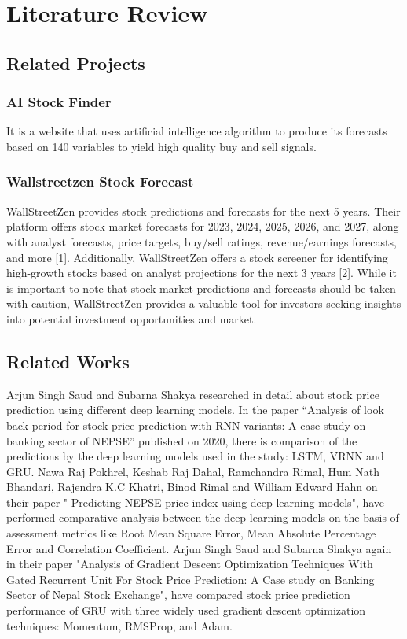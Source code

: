 \chapter{Literature Review}
\vspace{-18pt}
\section{Related Projects}
\vspace{-18pt}
\subsection{AI Stock Finder}
\vspace{-18pt}
It is a website that uses artificial intelligence algorithm to produce its forecasts based on 140 variables to yield high quality buy and sell signals. 
 \vspace{-10pt}
\subsection{Wallstreetzen Stock Forecast}
\vspace{-18pt}
WallStreetZen provides stock predictions and forecasts for the next 5 years. Their platform offers stock market forecasts for 2023, 2024, 2025, 2026, and 2027, along with analyst forecasts, price targets, buy/sell ratings, revenue/earnings forecasts, and more [1]. Additionally, WallStreetZen offers a stock screener for identifying high-growth stocks based on analyst projections for the next 3 years [2]. While it is important to note that stock market predictions and forecasts should be taken with caution, WallStreetZen provides a valuable tool for investors seeking insights into potential investment opportunities and market.
\vspace{-10pt}
\section{Related Works}
\vspace{-18pt}
Arjun Singh Saud and Subarna Shakya researched in detail about stock price prediction using different deep learning models. In the paper “Analysis of look back period for stock price prediction with RNN variants: A case study on banking sector of NEPSE” published on 2020, there is comparison of the predictions by the deep learning models used in the study: LSTM, VRNN and GRU. \cite{} Nawa Raj Pokhrel, Keshab Raj Dahal, Ramchandra Rimal, Hum Nath Bhandari, Rajendra K.C Khatri, Binod Rimal and William Edward Hahn on their paper " Predicting NEPSE price index using deep learning models", have performed comparative analysis between the deep learning models on the basis of assessment metrics like Root Mean Square Error, Mean Absolute Percentage Error and Correlation Coefficient. \cite{}  Arjun Singh Saud and Subarna Shakya again in their paper "Analysis of Gradient Descent Optimization Techniques With Gated Recurrent Unit For Stock Price Prediction: A Case study on Banking Sector of Nepal Stock Exchange", have compared stock price prediction performance of GRU with three widely used gradient descent optimization techniques: Momentum, RMSProp, and Adam.\cite{}
